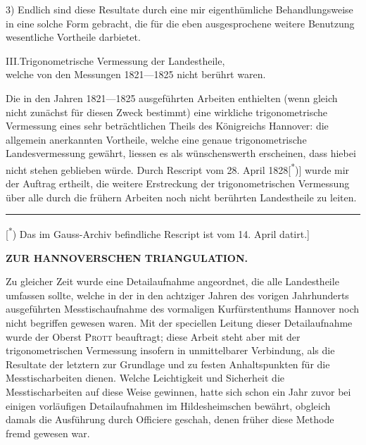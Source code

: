 \par\noindent\hspace*{\parindent}3) Endlich sind diese Resultate durch eine mir eigenthümliche Behandlungsweise in eine solche Form gebracht, die für die eben ausgesprochene weitere Benutzung wesentliche Vortheile darbietet.

\begin{center}
III.\quad Trigonometrische Vermessung der Landestheile,\\
welche von den Messungen 1821---1825 nicht berührt waren.
\end{center}

\par\noindent\hspace*{\parindent}Die in den Jahren 1821---1825 ausgeführten Arbeiten enthielten (wenn gleich nicht zunächst für diesen Zweck bestimmt) eine wirkliche trigonometrische Vermessung eines sehr beträchtlichen Theils des Königreichs Hannover: die allgemein anerkannten Vortheile, welche eine genaue trigonometrische Landesvermessung gewährt, liessen es als wünschenswerth erscheinen, dass hiebei nicht stehen geblieben würde. Durch Rescript vom 28. April 1828[\textsuperscript{*})] wurde mir der Auftrag ertheilt, die weitere Erstreckung der trigonometrischen Vermessung über alle durch die frühern Arbeiten noch nicht berührten Landestheile zu leiten.

\par\smallskip\noindent\rule{.24\linewidth}{.4pt}\par\smallskip
{\footnotesize\noindent\hspace*{\parindent}[\textsuperscript{*}) Das im Gauss-Archiv befindliche Rescript ist vom 14. April datirt.]\par}

\par\clearpage
\noindent\null\hfill{\small\textbf{ZUR HANNOVERSCHEN TRIANGULATION.}}\hfill{}\par\medskip

\par\noindent\hspace*{\parindent}Zu gleicher Zeit wurde eine Detailaufnahme angeordnet, die alle Landestheile umfassen sollte, welche in der in den achtziger Jahren des vorigen Jahrhunderts ausgeführten Messtischaufnahme des vormaligen Kurfürstenthums Hannover noch nicht begriffen gewesen waren. Mit der speciellen Leitung dieser Detailaufnahme wurde der Oberst \textsc{Prott} beauftragt; diese Arbeit steht aber mit der trigonometrischen Vermessung insofern in unmittelbarer Verbindung, als die Resultate der letztern zur Grundlage und zu festen Anhaltspunkten für die Messtischarbeiten dienen. Welche Leichtigkeit und Sicherheit die Messtischarbeiten auf diese Weise gewinnen, hatte sich schon ein Jahr zuvor bei einigen vorläufigen Detailaufnahmen im Hildesheimschen bewährt, obgleich damals die Ausführung durch Officiere geschah, denen früher diese Methode fremd gewesen war.

